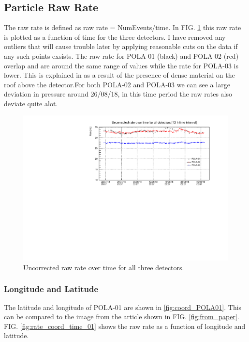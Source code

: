 \documentclass[prX, twocolumn, a4paper]{revtex4}
\begin{document}
\subsection{Particle Raw Rate}

The raw rate is defined as raw rate = NumEvents/time. In FIG. \ref{fig:rawrate_time_all} this raw rate is plotted as a function of time for the three detectors. I have removed any outliers that will cause trouble later by applying reasonable cuts on the data if any such points exsists. The raw rate for POLA-01 (black) and POLA-02 (red) overlap and are around the same range of values while the rate for POLA-03 is lower. This is explained in \cite{EEEcosmicrays} as a result of the presence of dense material on the roof above the detector.For both POLA-02 and POLA-03 we can see a large deviation in pressure around 26/08/18, in this time period the raw rates also deviate quite alot. 

\begin{figure}
    \centering
    \includegraphics[width=\linewidth]{figures/all_raw3_fixed.pdf}
    \caption{Uncorrected raw rate over time for all three detectors.}
    \label{fig:rawrate_time_all}
\end{figure}

\subsubsection{Longitude and Latitude}

The latitude and longitude of POLA-01 are shown in \ref{fig:coord_POLA01}. This can be compared to the image from the article \cite{EEEcosmicrays} shown in FIG. \ref{fig:from_paper}. FIG. \ref{fig:rate_coord_time_01} shows the raw rate as a function of longitude and latitude.
\end{document}
